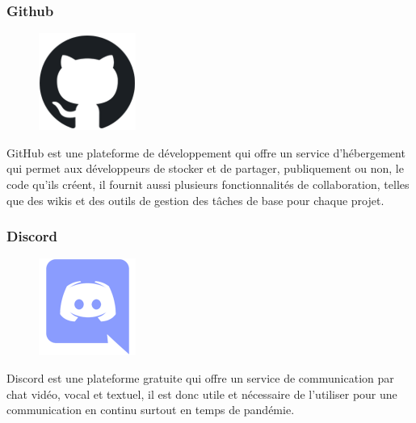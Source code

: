         \subsubsection*{Github}
            \begin{figure}
                \vspace{-22pt}
              \begin{center}
                 \includegraphics[scale=0.36]{images/logo/github.png}
                 \label{fig64}
              \end{center}
              \vspace{-20pt}
              \vspace{-10pt}
            \end{figure}
            GitHub est une plateforme de développement qui offre un service d’hébergement qui permet aux développeurs de stocker et de partager, publiquement ou non, le code qu’ils créent, il fournit aussi plusieurs fonctionnalités de collaboration, telles que des wikis et des outils de gestion des tâches de base pour chaque projet\cite{40}.
        
        \subsubsection*{Discord}
        
            \begin{figure}
                \vspace{-22pt}
              \begin{center}
                 \includegraphics[scale=0.36]{images/logo/discord.png}
                 \label{fig65}
              \end{center}
              \vspace{-20pt}
              \vspace{-10pt}
            \end{figure}
            Discord est une plateforme gratuite qui offre un service de communication par chat vidéo, vocal et textuel, il est donc utile et nécessaire de l’utiliser pour une communication en continu surtout en temps de pandémie\cite{40}.
        
